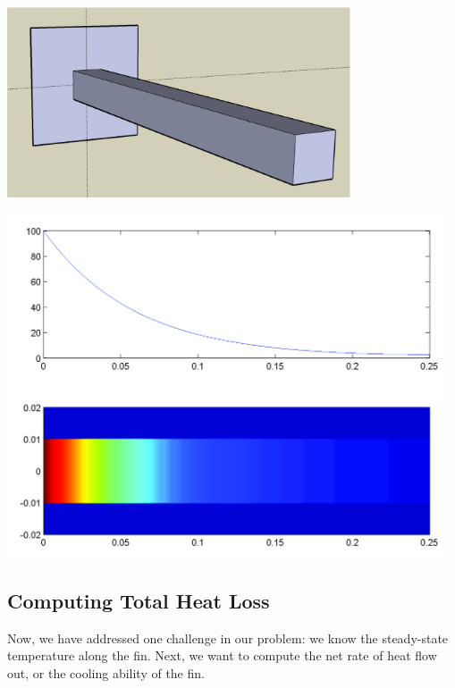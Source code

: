 \begin{center}
\begin{minipage}{4.0in}
\includegraphics[width=4.0in]{graphics/notes_06_LongPin3D}
\end{minipage}
\begin{minipage}{4.0in}
\begin{center}
\includegraphics[height=4.0in]{graphics/notes_06_FinTemperature1}
\end{center}
\end{minipage}
\end{center}


\newpage


\subsection*{Computing Total Heat Loss}
Now, we have addressed one challenge in our problem: we know the
steady-state temperature along the fin.  Next, we want to compute
the net rate of heat flow out, or the cooling ability of the fin.

